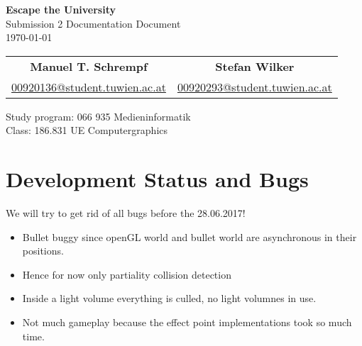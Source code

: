\documentclass[12pt]{article}
\begin{document}
\begin{titlepage}
 \vspace*{8cm}
\begin{center}
 \textbf{\Huge Escape the University} \\
  \vspace{3mm}
 {\Large Submission 2 Documentation Document\\
  \vspace{3mm}
  \today}
 \vspace{5mm}
\begin{table}[h!]
  \centering
  \begin{tabular}{c c}
	\textbf{Manuel T. Schrempf}  &   \textbf{Stefan Wilker}\\
	\href{mailto:00920136@student.tuwien.ac.at}{00920136@student.tuwien.ac.at}&
	\href{mailto:00920293@student.tuwien.ac.at}{00920293@student.tuwien.ac.at}\\
  \end{tabular}
\end{table}

 \vspace{3mm}
{\large Study program: 066 935 Medieninformatik\\
 \vspace{2mm}
Class: 186.831 UE Computergraphics}
\end{center}
\end{titlepage}

\tableofcontents %

\thispagestyle{empty}
\newpage
\pagestyle{plain}
\setcounter{page}{1}

\section{Development Status and Bugs}
We will try to get rid of all bugs before the 28.06.2017!
\begin{itemize}
\item Bullet buggy since openGL world and bullet world are asynchronous in their positions.
\item Hence for now only partiality collision detection
\item Inside a light volume everything is culled, no light volumnes in use.
\item Not much gameplay because the effect point implementations took so much time.
\end{itemize}
\end{document}
